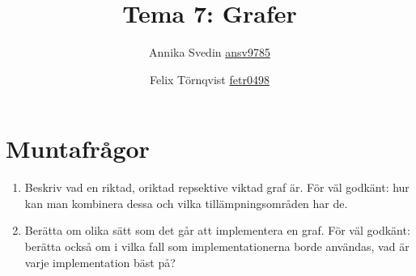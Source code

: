 \documentclass[a5paper,10pt,oneside]{article}
\title{Tema 7: Grafer}
\author{Annika Svedin \url{ansv9785} \and Felix Törnqvist \url{fetr0498}}
\begin{document}
\maketitle

\section*{Muntafrågor}

\begin{enumerate}
	\item Beskriv vad en riktad, oriktad repsektive viktad graf är. För väl godkänt: hur kan man kombinera dessa och vilka tillämpningsområden har de.
	
	\item Berätta om olika sätt som det går att implementera en graf. För väl godkänt: berätta också om i vilka fall som implementationerna borde användas, vad är varje implementation bäst på?
\end{enumerate}
\end{document}
